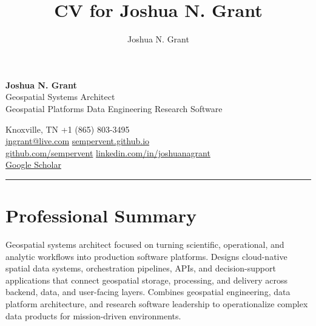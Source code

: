 \documentclass[10pt]{article}
\author{Joshua N. Grant}
\title{CV for Joshua N. Grant}
\newcommand{\sectionline}{\vspace{0.25em}\noindent\rule{\textwidth}{0.4pt}\vspace{-0.45em}}
\newcommand{\cvsection}[2]{\sectionline\section*{{\mdseries #1}\hspace{0.35em}#2}\vspace{-0.45em}}
\newcommand{\contactitem}[3]{#1\hspace{0.35em}\href{#2}{#3}}
\begin{document}
\pagestyle{empty}
\setcounter{page}{1}
\renewcommand{\thepage}{\arabic{page}}

\begin{minipage}[t]{0.43\linewidth}
    {\Huge \textbf{Joshua N. Grant}}\\[-0.1em]
    {\large Geospatial Systems Architect}\\
    {\small Geospatial Platforms \textbar{} Data Engineering \textbar{} Research Software}
\end{minipage}
\hfill
\begin{minipage}[t]{0.55\linewidth}
    \raggedleft
    {\small
    \faMapMarker\hspace{0.35em}Knoxville, TN \quad
    \faPhone\hspace{0.35em}+1 (865) 803-3495\\
    \contactitem{\faEnvelope}{mailto:jngrant@live.com}{jngrant@live.com} \quad
    \contactitem{\faGlobe}{https://sempervent.github.io}{sempervent.github.io}\\
    \contactitem{\faGithub}{https://github.com/sempervent}{github.com/sempervent} \quad
    \contactitem{\faLinkedin}{https://linkedin.com/in/joshuanagrant}{linkedin.com/in/joshuanagrant}\\
    \contactitem{\faGraduationCap}{https://scholar.google.com/citations?user=vs-HJQcAAAAJ&hl=en}{Google Scholar}
    }
\end{minipage}

\cvsection{\faUser}{Professional Summary}
Geospatial systems architect focused on turning scientific, operational, and analytic workflows into production software platforms. Designs cloud-native spatial data systems, orchestration pipelines, APIs, and decision-support applications that connect geospatial storage, processing, and delivery across backend, data, and user-facing layers. Combines geospatial engineering, data platform architecture, and research software leadership to operationalize complex data products for mission-driven environments.
\end{document}

